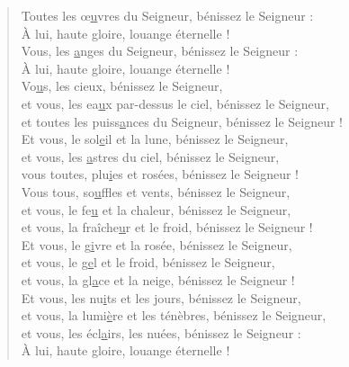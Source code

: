\begin{verse}
Toutes les œ\underline{u}vres du Seigneur,\psalmstar
bénissez le Seigneur :\\
À lui, haute gloire, louange éternelle !\\

Vous, les \underline{a}nges du Seigneur,\psalmstar
bénissez le Seigneur :\\
À lui, haute gloire, louange éternelle !\\

Vo\underline{u}s, les cieux,\psalmstar
bénissez le Seigneur,\\
et vous, les ea\underline{u}x par-dessus le ciel,\psalmstar
bénissez le Seigneur,\\
et toutes les puiss\underline{a}nces du Seigneur,\psalmstar
bénissez le Seigneur !\\

Et vous, le sol\underline{e}il et la lune,\psalmstar
bénissez le Seigneur,\\
et vous, les \underline{a}stres du ciel,\psalmstar
bénissez le Seigneur,\\
vous toutes, plu\underline{i}es et rosées,\psalmstar
bénissez le Seigneur !\\

Vous tous, so\underline{u}ffles et vents,\psalmstar
bénissez le Seigneur,\\
et vous, le fe\underline{u} et la chaleur,\psalmstar
bénissez le Seigneur,\\
et vous, la fraîche\underline{u}r et le froid,\psalmstar
bénissez le Seigneur !\\

Et vous, le g\underline{i}vre et la rosée,\psalmstar
bénissez le Seigneur,\\
et vous, le g\underline{e}l et le froid,\psalmstar
bénissez le Seigneur,\\
et vous, la gl\underline{a}ce et la neige,\psalmstar
bénissez le Seigneur !\\

Et vous, les nu\underline{i}ts et les jours,\psalmstar
bénissez le Seigneur,\\
et vous, la lumi\underline{è}re et les ténèbres,\psalmstar
bénissez le Seigneur,\\
et vous, les écl\underline{a}irs, les nuées,\psalmstar
bénissez le Seigneur :\\
À lui, haute gloire, louange éternelle !\\


\end{verse}
